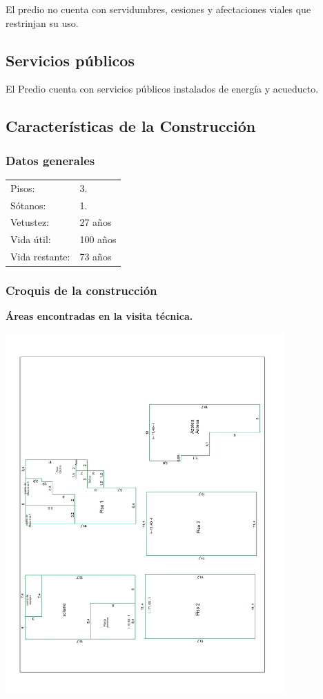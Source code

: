 \documentclass[12pt,a4paper,twoside]{article}
\begin{document}
{El predio no cuenta con servidumbres, cesiones y afectaciones viales que restrinjan su uso.

\subsection{Servicios públicos}
	

	El Predio cuenta con servicios públicos instalados de energía y acueducto.
\subsection{Características de la Construcción}

\subsubsection{Datos generales}
%
\begin{tabular}{ l l }
%	
	Pisos: & 3.\\
	Sótanos: & 1.\\
	Vetustez: & 27 años \\
	Vida útil: & 100 años \\
	Vida restante: & 73 años \\
%	
\end{tabular}
%
\subsubsection{Croquis de la construcción}
%
\textbf{Áreas encontradas en la visita técnica.} \\
%
%
\begin{center}
	\includegraphics[width=0.8\textwidth]{Imagenes/PLANO}
\end{center}
%
}
\end{document}
